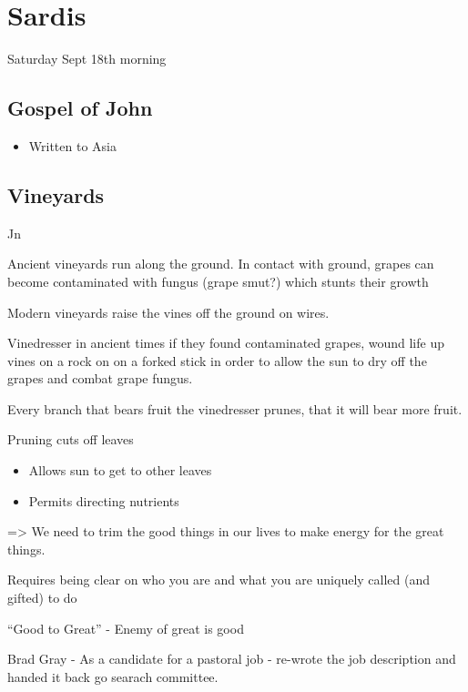 \documentclass[
]{book}
\providecommand{\tightlist}{%
  \setlength{\itemsep}{0pt}\setlength{\parskip}{0pt}}
\begin{document}
\hypertarget{sardis}{%
\chapter{Sardis}\label{sardis}}

Saturday Sept 18th morning

\hypertarget{gospel-of-john}{%
\section{Gospel of John}\label{gospel-of-john}}

\begin{itemize}
\tightlist
\item
  Written to Asia
\end{itemize}

\hypertarget{vineyards}{%
\section{Vineyards}\label{vineyards}}

Jn

Ancient vineyards run along the ground. In contact with ground, grapes can become contaminated with fungus (grape smut?) which stunts their growth

Modern vineyards raise the vines off the ground on wires.

Vinedresser in ancient times if they found contaminated grapes, wound life up vines on a rock on on a forked stick in order to allow the sun to dry off the grapes and combat grape fungus.

Every branch that bears fruit the vinedresser prunes, that it will bear more fruit.

Pruning cuts off leaves

\begin{itemize}
\tightlist
\item
  Allows sun to get to other leaves
\item
  Permits directing nutrients
\end{itemize}

=\textgreater{} We need to trim the good things in our lives to make energy for the great things.

Requires being clear on who you are and what you are uniquely called (and gifted) to do

``Good to Great'' - Enemy of great is good

Brad Gray - As a candidate for a pastoral job - re-wrote the job description and handed it back go searach committee.
\end{document}

